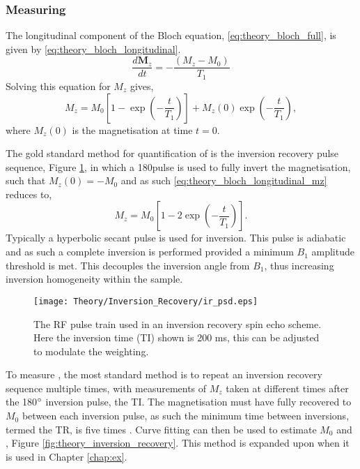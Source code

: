 \subsubsection{Measuring \tone}
The longitudinal component of the Bloch equation, \eqref{eq:theory_bloch_full}, is given by \eqref{eq:theory_bloch_longitudinal}.
\begin{equation}
\frac{d\mathbf{M}_z}{dt} = - \frac{\left( M_z - M_0 \right)}{T_1}
\label{eq:theory_bloch_longitudinal}
\end{equation}
Solving this equation for $M_z$ gives,
\begin{equation}
M_z = M_0 \left[1 - \exp\left(-\frac{t}{T_1}\right) \right] + M_z\left( 0 \right) \exp \left(-\frac{t}{T_1}\right), 
\label{eq:theory_bloch_longitudinal_mz}
\end{equation}
where $M_z\left( 0 \right)$ is the magnetisation at time $t=0$.

\newpage
The gold standard method for quantification of \tone is the inversion recovery pulse sequence, Figure \ref{fig:theory_inversion_recovery_psd}, in which a 180\degree{ }pulse is used to fully invert the magnetisation, such that $M_z(0) = -M_0$ and as such \eqref{eq:theory_bloch_longitudinal_mz} reduces to,
\begin{equation}
M_z = M_0 \left[1 - 2\exp\left(-\frac{t}{T_1}\right) \right].
\label{eq:theory_bloch_longitudinal_mz_inversion}
\end{equation}
Typically a hyperbolic secant pulse is used for inversion. This pulse is adiabatic and as such a complete inversion is performed provided a minimum $B_1$ amplitude threshold is met. This decouples the inversion angle from $B_1$, thus increasing inversion homogeneity within the sample.

\begin{figure}[H]
	\centering
	\texttt{[image: Theory/Inversion\_Recovery/ir\_psd.eps]}
	\caption{The \ac{RF} pulse train used in an inversion recovery spin echo scheme. Here the inversion time (\acs*{TI}) shown is 200 ms, this can be adjusted to modulate the \tone weighting.}
	\label{fig:theory_inversion_recovery_psd}	
\end{figure}

To measure \tone, the most standard method is to repeat an inversion recovery sequence multiple times, with measurements of $M_z$ taken at different times after the 180$\degree$ inversion pulse, the \ac{TI}. The magnetisation must have fully recovered to $M_0$ between each inversion pulse, as such the minimum time between inversions, termed the \ac{TR}, is five times \tone. Curve fitting can then be used to estimate $M_0$ and \tone, Figure \ref{fig:theory_inversion_recovery}.
This method is expanded upon when it is used in Chapter \ref{chap:ex}.

